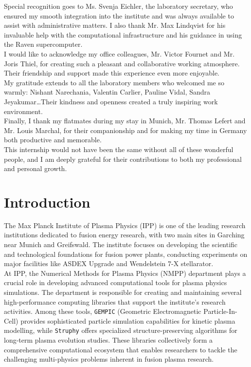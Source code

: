 \documentclass[a4paper,12pt,twoside]{report}
\begin{document}
Special recognition goes to Ms. Svenja Eichler, the laboratory secretary, who ensured my smooth integration into the institute and was always available to assist with administrative matters. I also thank Mr. Max Lindqvist for his invaluable help with the computational infrastructure and his guidance in using the Raven supercomputer.\\

I would like to acknowledge my office colleagues, Mr. Victor Fournet and Mr. Joris Thiel, for creating such a pleasant and collaborative working atmosphere. Their friendship and support made this experience even more enjoyable.\\

My gratitude extends to all the laboratory members who welcomed me so warmly: Nishant Narechania, Valentin Carlier, Pauline Vidal, Sandra Jeyakumar\dots Their kindness and openness created a truly inspiring work environment.\\

Finally, I thank my flatmates during my stay in Munich, Mr. Thomas Lefert and Mr. Louis Marchal, for their companionship and for making my time in Germany both productive and memorable.\\

This internship would not have been the same without all of these wonderful people, and I am deeply grateful for their contributions to both my professional and personal growth.\\


\newpage
\tableofcontents
\thispagestyle{test}

\newpage
\listoffigures
{}


\newpage
\chapter{Introduction}

The Max Planck Institute of Plasma Physics (IPP) is one of the leading research institutions dedicated to fusion energy research, with two main sites in Garching near Munich and Greifswald. The institute focuses on developing the scientific and technological foundations for fusion power plants, conducting experiments on major facilities like ASDEX Upgrade and Wendelstein 7-X stellarator. \\

At IPP, the Numerical Methods for Plasma Physics (NMPP) department plays a crucial role in developing advanced computational tools for plasma physics simulations. The department is responsible for creating and maintaining several high-performance computing libraries that support the institute's research activities. Among these tools, \texttt{GEMPIC} (Geometric Electromagnetic Particle-In-Cell) provides sophisticated particle simulation capabilities for kinetic plasma modelling, while \texttt{Struphy} offers specialized structure-preserving algorithms for long-term plasma evolution studies. These libraries collectively form a comprehensive computational ecosystem that enables researchers to tackle the challenging multi-physics problems inherent in fusion plasma research.\\
\end{document}
